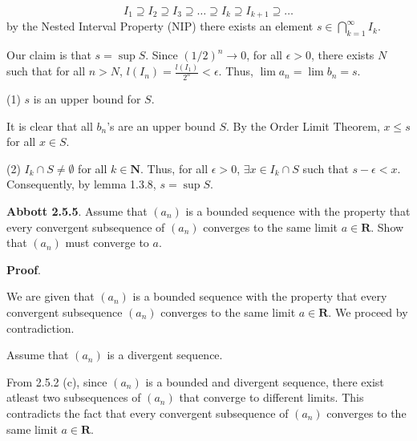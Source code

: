 \documentclass[10pt]{article}
\begin{document}
\begin{equation*}
I_{1} \supseteq I_{2} \supseteq I_{3} \supseteq \dotsc \supseteq I_{k} \supseteq I_{k+1} \supseteq \dotsc 
\end{equation*}
by the Nested Interval Property (NIP) there exists an element $\displaystyle s\in \bigcap _{k=1}^{\infty } I_{k}$. \ 



Our claim is that $\displaystyle s=\sup S$. Since $\displaystyle ( 1/2)^{n}\rightarrow 0$, for all $\displaystyle \epsilon  >0$, there exists $\displaystyle N$ such that for all $\displaystyle n >N$, $\displaystyle l( I_{n}) =\frac{l( I_{1})}{2^{n}} < \epsilon $. Thus, $\displaystyle \lim a_{n} =\lim b_{n} =s$. 



(1) $\displaystyle s$ is an upper bound for $\displaystyle S$. 



It is clear that all $\displaystyle b_{n}$'s are an upper bound $\displaystyle S$. By the Order Limit Theorem, $\displaystyle x\leq s$ for all $\displaystyle x\in S$.



(2) $\displaystyle I_{k} \cap S\neq \emptyset $ for all $\displaystyle k\in \mathbf{N}$. Thus, for all $\displaystyle \epsilon  >0$, $\displaystyle \exists x\in I_{k} \cap S$ such that $\displaystyle s-\epsilon < x$. Consequently, by lemma 1.3.8, $\displaystyle s=\sup S$.



\textbf{Abbott 2.5.5}. Assume that $\displaystyle ( a_{n})$ is a bounded sequence with the property that every convergent subsequence of $\displaystyle ( a_{n})$ converges to the same limit $\displaystyle a\in \mathbf{R}$. Show that $\displaystyle ( a_{n})$ must converge to $\displaystyle a$.



\textbf{Proof}.



We are given that $\displaystyle ( a_{n})$ is a bounded sequence with the property that every convergent subsequence $\displaystyle ( a_{n})$ converges to the same limit $\displaystyle a\in \mathbf{R}$. We proceed by contradiction. 

Assume that $\displaystyle ( a_{n})$ is a divergent sequence.



From 2.5.2 (c), since $\displaystyle ( a_{n})$ is a bounded and divergent sequence, there exist atleast two subsequences of $\displaystyle ( a_{n})$ that converge to different limits. This contradicts the fact that every convergent subsequence of $\displaystyle ( a_{n})$ converges to the same limit $\displaystyle a\in \mathbf{R}$. 
\end{document}
